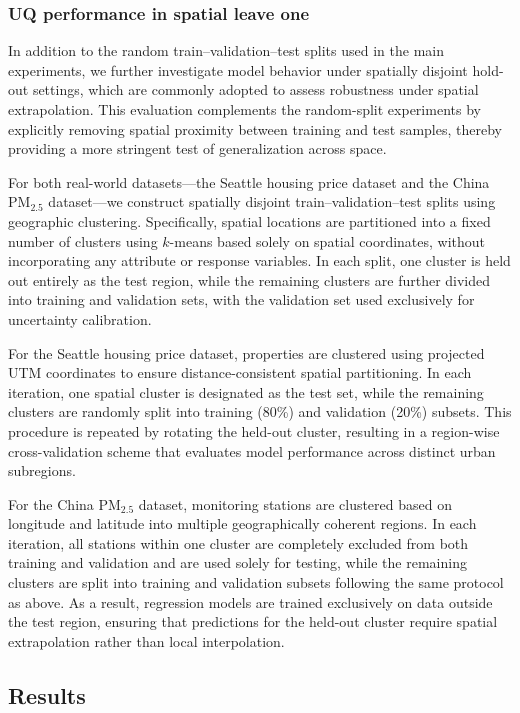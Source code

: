 \documentclass[authoryear,preprint,review,12pt]{elsarticle}
\begin{document}
\subsubsection{UQ performance in spatial leave one}
{
\color{red}
In addition to the random train--validation--test splits used in the main experiments, we further investigate model behavior under spatially disjoint hold-out settings, which are commonly adopted to assess robustness under spatial extrapolation. This evaluation complements the random-split experiments by explicitly removing spatial proximity between training and test samples, thereby providing a more stringent test of generalization across space.

For both real-world datasets—the Seattle housing price dataset and the China PM$_{2.5}$ dataset—we construct spatially disjoint train--validation--test splits using geographic clustering. Specifically, spatial locations are partitioned into a fixed number of clusters using $k$-means based solely on spatial coordinates, without incorporating any attribute or response variables. In each split, one cluster is held out entirely as the test region, while the remaining clusters are further divided into training and validation sets, with the validation set used exclusively for uncertainty calibration.

For the Seattle housing price dataset, properties are clustered using projected UTM coordinates to ensure distance-consistent spatial partitioning. In each iteration, one spatial cluster is designated as the test set, while the remaining clusters are randomly split into training (80\%) and validation (20\%) subsets. This procedure is repeated by rotating the held-out cluster, resulting in a region-wise cross-validation scheme that evaluates model performance across distinct urban subregions.

For the China PM$_{2.5}$ dataset, monitoring stations are clustered based on longitude and latitude into multiple geographically coherent regions. In each iteration, all stations within one cluster are completely excluded from both training and validation and are used solely for testing, while the remaining clusters are split into training and validation subsets following the same protocol as above. As a result, regression models are trained exclusively on data outside the test region, ensuring that predictions for the held-out cluster require spatial extrapolation rather than local interpolation.

}
\subsection{Results}
\end{document}
